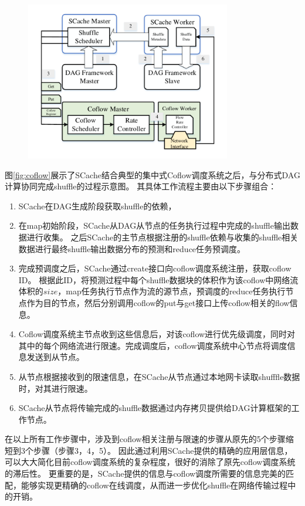 \begin{figure}[!htp]
    \centering
    \includegraphics[width=0.8\textwidth]{../figure/coflow.pdf}
\end{figure}

图\ref{fig:coflow}展示了SCache结合典型的集中式Coflow调度系统之后，与分布式DAG计算协同完成shuffle的过程示意图。
其具体工作流程主要由以下步骤组合：

\begin{enumerate}
	\item SCache在DAG生成阶段获取shuffle的依赖，
	\item 在map初始阶段，SCache从DAG从节点的任务执行过程中完成的shuffle输出数据进行收集。
	之后SCache的主节点根据注册的shuffle依赖与收集的shuffle相关数据进行最终shuffle输出数据分布的预测和reduce任务预调度。
	\item 完成预调度之后，SCache通过create接口向coflow调度系统注册，获取coflow ID。
	根据此ID，将预测过程中每个shuffle数据块的体积作为该coflow中网络流体积的$size$，map任务执行节点作为流的源节点，预调度的reduce任务执行节点作为目的节点，然后分别调用coflow的put与get接口上传coflow相关的flow信息。
	\item Coflow调度系统主节点收到这些信息后，对该coflow进行优先级调度，同时对其中的每个网络流进行限速。完成调度后，coflow调度系统中心节点将调度信息发送到从节点。
	\item 从节点根据接收到的限速信息，在SCache从节点通过本地网卡读取shufffle数据时，对其进行限速。
	\item SCache从节点将传输完成的shuffle数据通过内存拷贝提供给DAG计算框架的工作节点。
\end{enumerate}

在以上所有工作步骤中，涉及到coflow相关注册与限速的步骤从原先的5个步骤缩短到3个步骤（步骤3，4，5）。
因此通过利用SCache提供的精确的应用层信息，可以大大简化目前coflow调度系统的复杂程度，很好的消除了原先coflow调度系统的滞后性。
更重要的是，SCache提供的信息与coflow调度所需要的信息完美的匹配，能够实现更精确的coflow在线调度，从而进一步优化shuffle在网络传输过程中的开销。

